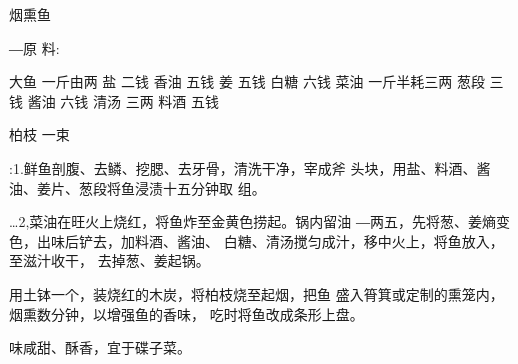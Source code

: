 \begin{recipe}{烟熏鱼}

―原 料:

大鱼	一斤由两	盐	二钱
香油	五钱	姜	五钱
白糖	六钱	菜油	一斤半耗三两
葱段	三钱	酱油	六钱
清汤	三两	料酒	五钱

柏枝	一束

\cooking

:1.鲜鱼剖腹、去鳞、挖腮、去牙骨，清洗干净，宰成斧 头块，用盐、料酒、酱油、姜片、葱段将鱼浸渍十五分钟取 组。

…2,菜油在旺火上烧红，将鱼炸至金黄色捞起。锅内留油 ―两五，先将葱、姜熵变色，出味后铲去，加料酒、酱油、 白糖、清汤搅匀成汁，移中火上，将鱼放入，至滋汁收干， 去掉葱、姜起锅。

\step 用土钵一个，装烧红的木炭，将柏枝烧至起烟，把鱼 盛入筲箕或定制的熏笼内，烟熏数分钟，以增强鱼的香味， 吃时将鱼改成条形上盘。

\notes

味咸甜、酥香，宜于碟子菜。

\end{recipe}

